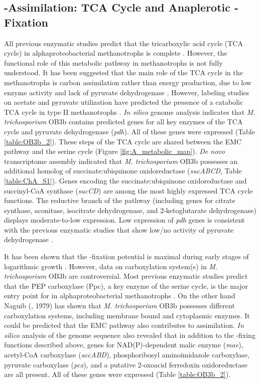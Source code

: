 \subsection{-Assimilation: TCA Cycle and Anaplerotic -Fixation}
All previous enzymatic studies predict that the tricarboxylic acid cycle (TCA cycle) in alphaproteobacterial methanotrophs is complete \cite{trotsenko2008}.
However, the functional role of this metabolic pathway in methanotrophs is not fully understood.
It has been suggested that the main role of the TCA cycle in the methanotrophs is carbon assimilation rather than energy production, due to low enzyme activity and lack of pyruvate dehydrogenase \cite{trotsenko1976, anthony1982, shishkina1982, trotsenko2008}.
However, labeling studies on acetate and pyruvate utilization have predicted the presence of a catabolic TCA cycle in type II methanotrophs \cite{wadzinski1975, higgins1981}.
\textit{In silico} genome analysis indicates that \textit{M. trichosporium} OB3b contains predicted genes for all key enzymes of the TCA cycle and pyruvate dehydrogenase (\textit{pdh}).
All of these genes were expressed (Table \ref{table:OB3b_2}).
These steps of the TCA cycle are shared between the EMC pathway and the serine cycle (Figure \ref{fig:A_metabolic_map}).
\textit{De novo} transcriptome assembly indicated that \textit{M. trichosporium} OB3b possesses an additional homolog of succinate:ubiquinone oxidoreductase (\textit{sucABCD}, Table \ref{table:ChA_S1}).
Genes encoding the succinate:ubiquinone oxidoreductase and succinyl-CoA synthase (\textit{sucCD}) are among the most highly expressed TCA cycle functions.
The reductive branch of the pathway (including genes for citrate synthase, aconitase, isocitrate dehydrogenase, and 2-ketoglutarate dehydrogenase) displays moderate-to-low expression.
Low expression of \textit{pdh} genes is consistent with the previous enzymatic studies that show low/no activity of pyruvate dehydrogenase \cite{trotsenko1976}.

It has been shown that the -fixation potential is maximal during early stages of logarithmic growth \cite{park1991, park1992}.
However, data on carboxylation system(s) in \textit{M. trichosporium} OB3b are controversial.
Most previous enzymatic studies predict that the PEP carboxylase (Ppc), a key enzyme of the serine cycle, is the major entry point for  in alphaproteobacterial methanotrophs \cite{shishkina1982}.
On the other hand Naguib (\cite{naguib1979}, 1979) has shown that \textit{M. trichosporium} OB3b possesses different carboxylation systems, including membrane bound and cytoplasmic enzymes.
It could be predicted that the EMC pathway also contributes to  assimilation.
\textit{In silico} analysis of the genome sequence also revealed that in addition to the -fixing functions described above, genes for NAD(P)-dependent malic enzyme (\textit{mae}), acetyl-CoA carboxylase (\textit{accABD}), phosphoribosyl aminoimidazole carboxylase, pyruvate carboxylase (\textit{pcx}), and a putative 2-oxoacid ferredoxin oxidoreductase are all present.
All of these genes were expressed (Table \ref{table:OB3b_2}).

